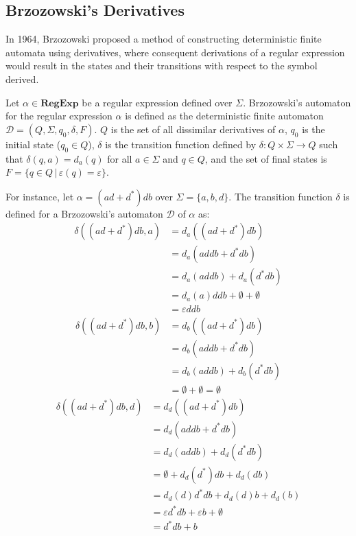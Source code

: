 \subsection{Brzozowski's Derivatives}
In 1964, Brzozowski \cite{brzozowski_derivatives} proposed a method of constructing deterministic finite automata using derivatives, where consequent derivations of a regular expression would result in the states and their transitions with respect to the symbol derived.

\begin{defn}
	Let $\alpha \in \textbf{RegExp}$ be a regular expression defined over $\Sigma$. Brzozowski's automaton for the regular expression $\alpha$ is defined as the deterministic finite automaton $\mathcal{D} = (Q, \Sigma, q_0, \delta, F)$. $Q$ is the set of all dissimilar derivatives of $\alpha$, $q_0$ is the initial state ($q_0 \in Q$), $\delta$ is the transition function defined by $\delta: Q \times \Sigma \rightarrow Q$ such that $\delta (q,a) = d_a(q)$ for all $a \in \Sigma$ and $q \in Q$, and the set of final states is $F = \{q \in Q \, | \, \varepsilon(q) = \varepsilon\}$.
\end{defn}

For instance, let $\alpha = (ad+d^*)db$ over $\Sigma = \{a,b,d\}$. The transition function $\delta$ is defined for a Brzozowski's automaton $\mathcal{D}$ of $\alpha$ as:
\begin{align*}
	\delta((ad + d^*)db, a) &= d_a((ad + d^*)db) \\
	&= d_a(addb + d^*db) \\
	&= d_a(addb) + d_a(d^*db) \\
	&= d_a(a)ddb + \emptyset + \emptyset \\
	&= \varepsilon ddb
\end{align*}
\begin{align*}
	\delta((ad + d^*)db, b) &= d_b((ad + d^*)db) \\
	&= d_b(addb + d^*db) \\
	&= d_b(addb) + d_b(d^*db) \\
	&= \emptyset + \emptyset = \emptyset
\end{align*}
\begin{align*}
	\delta((ad + d^*)db, d) &= d_d((ad + d^*)db) \\
	&= d_d(addb + d^*db) \\
	&= d_d(addb) + d_d(d^*db) \\
	&= \emptyset + d_d(d^*)db + d_d(db) \\
	&= d_d(d)d^*db + d_d(d)b + d_d(b) \\
	&= \varepsilon d^*db + \varepsilon b + \emptyset \\
	&= d^*db + b
\end{align*}


